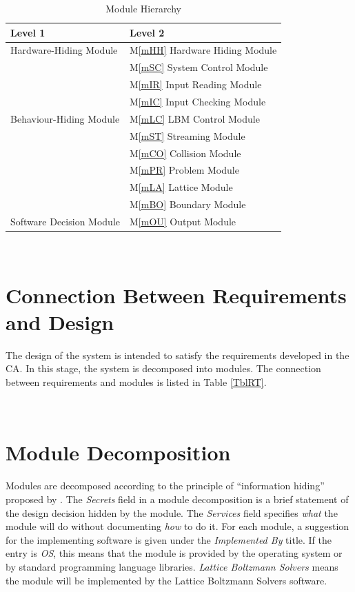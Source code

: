 \documentclass[12pt, titlepage]{article}
\newcommand{\mref}[1]{M\ref{#1}}
\newcommand{\famname}{Lattice Boltzmann Solvers} %
\begin{document}
\begin{table}[h!]
\centering
\begin{tabular}{p{} p{}}
\toprule
\textbf{Level 1} & \textbf{Level 2}\\
\midrule

{Hardware-Hiding Module}
& \mref{mHH} Hardware Hiding Module\\
\midrule

\multirow{7}{0.3\textwidth}{Behaviour-Hiding Module}
& \mref{mSC} System Control Module\\
& \mref{mIR} Input Reading Module\\
& \mref{mIC} Input Checking Module\\
& \mref{mLC} LBM Control Module\\
& \mref{mST} Streaming Module\\
& \mref{mCO} Collision Module\\ 
& \mref{mPR} Problem Module\\
& \mref{mLA} Lattice Module\\
& \mref{mBO} Boundary Module\\
\midrule

\multirow{1}{0.3\textwidth}{Software Decision Module}
& \mref{mOU} Output Module\\
\bottomrule

\end{tabular}
\caption{Module Hierarchy}
\label{TblMH}
\end{table}

~\newpage

\section{Connection Between Requirements and Design} \label{SecConnection}

The design of the system is intended to satisfy the requirements developed in
the CA. In this stage, the system is decomposed into modules. The connection
between requirements and modules is listed in Table \ref{TblRT}.

~\newpage

\section{Module Decomposition} \label{SecMD}

Modules are decomposed according to the principle of ``information hiding''
proposed by \citet{ParnasEtAl1984}. The \emph{Secrets} field in a module
decomposition is a brief statement of the design decision hidden by the
module. The \emph{Services} field specifies \emph{what} the module will do
without documenting \emph{how} to do it. For each module, a suggestion for the
implementing software is given under the \emph{Implemented By} title. If the
entry is \emph{OS}, this means that the module is provided by the operating
system or by standard programming language libraries.  \emph{\famname{}} means the
module will be implemented by the \famname{} software.
\end{document}
